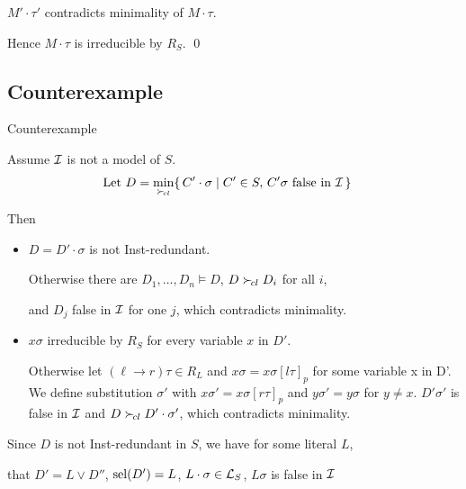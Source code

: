 \documentclass[%
handout,
]{beamer}
\begin{document}
\begin{frame}[allowframebreaks]
\begin{itemize}
            $M'\cdot\tau'$ contradicts minimality of $M\cdot\tau$.

        \end{itemize}

        Hence $M\cdot\tau$ is irreducible by $R_S$.
        \hfill\qed

\end{frame}

\subsection{Counterexample}
\begin{frame}[allowframebreaks]{Counterexample}

    Assume $\mathcal{I}$ is not a model of $S$.
    \begin{align*}
        \text{Let }
        D &= \min_{\mathrel\succ_{\!cl}}\{\,
        C'\cdot\sigma \mid C'\in S,\,
        C'\sigma\text{ false in }\mathcal{I}\,
        \}
    \end{align*}

    Then
    \begin{itemize}
        \item $D = D'\cdot\sigma$ is not Inst-redundant.
        \vspace{0.2em}

        Otherwise there are
        $D_1,\ldots,D_n\models D$, $D\mathrel\succ_{\!cl} D_i$ for all $i$,

        and $D_j$ false in $\mathcal{I}$ for one $j$, which contradicts minimality.

        \item $x\sigma$ irreducible by $R_S$ for every variable $x$ in $D'$.
        \vspace{0.2em}

        Otherwise let $(\ell\to r)\tau\in R_L$ and $x\sigma = x\sigma[l\tau]_p$ for some variable x in D'.
        We define substitution $\sigma'$ with $x\sigma' = x\sigma[r\tau]_p$ and $y\sigma' = y\sigma$ for $y\neq x$.
        $D'\sigma'$ is false in $\mathcal{I}$ and $D\mathrel\succ_{\!cl} D'\cdot\sigma'$,
        which contradicts minimality.
    \end{itemize}

\framebreak

    Since $D$ is not Inst-redundant in $S$,
    we have for some literal $L$,

    that $D' = L\lor D''$, $\operatorname{sel}(D') = L$, $L\cdot\sigma\in\mathcal{L}_S$,
    $L\sigma$ is false in $\mathcal{I}$


\end{frame}
\end{document}

